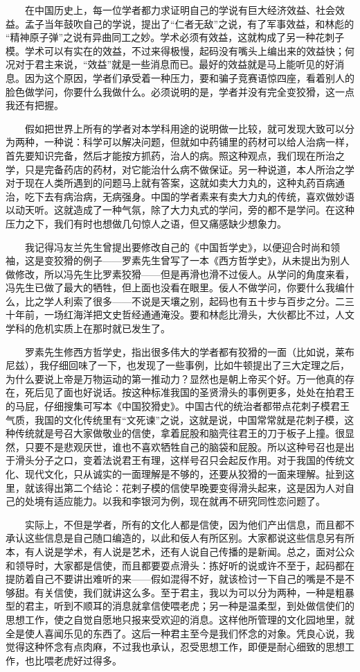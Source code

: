 　　在中国历史上，每一位学者都力求证明自己的学说有巨大经济效益、社会效益。孟子当年鼓吹自己的学说，提出了“仁者无敌”之说，有了军事效益，和林彪的 “精神原子弹”之说有异曲同工之妙。学术必须有效益，这就构成了另一种花刺子模。学术可以有实在的效益，不过来得极慢，起码没有嘴头上编出来的效益快；何况对于君主来说，“效益”就是一些消息而已。最好的效益就是马上能听见的好消息。因为这个原因，学者们承受着一种压力，要和骗子竞赛语惊四座，看着别人的脸色做学问，你要什么我做什么。必须说明的是，学者并没有完全变狡猾，这一点我还有把握。 

　　假如把世界上所有的学者对本学科用途的说明做一比较，就可发现大致可以分为两种，一种说：科学可以解决问题，但就如中药铺里的药材可以给人治病一样，首先要知识完备，然后才能按方抓药，治人的病。照这种观点，我们现在所治之学，只是完备药店的药材，对它能治什么病不做保证。另一种说道，本人所治之学对于现在人类所遇到的问题马上就有答案，这就如卖大力丸的，这种丸药百病通治，吃下去有病治病，无病强身。中国的学者素来有卖大力丸的传统，喜欢做妙语以动天听。这就造成了一种气氛，除了大力丸式的学问，旁的都不是学问。在这种压力之下，我们有时也想做几句惊人之语，但又痛感缺少想象力。 

　　我记得冯友兰先生曾提出要修改自己的《中国哲学史》，以便迎合时尚和领袖，这是变狡猾的例子——罗素先生曾写了一本《西方哲学史》，从未提出为别人做修改，所以冯先生比罗素狡猾——但是再滑也滑不过佞人。从学问的角度来看，冯先生已做了最大的牺牲，但上面也没看在眼里。佞人不做学问，你要什么我编什么，比之学人利索了很多——不说是天壤之别，起码也有五十步与百步之分。二三十年前，一场红海洋把文史哲经通通淹没。要和林彪比滑头，大伙都比不过，人文学科的危机实质上在那时就已发生了。 

　　罗素先生修西方哲学史，指出很多伟大的学者都有狡猾的一面（比如说，莱布尼兹），我仔细回味了一下，也发现了一些事例，比如牛顿提出了三大定理之后，为什么要说上帝是万物运动的第一推动力？显然也是朝上帝买个好。万一他真的存在，死后见了面也好说话。按这种标准我国的圣贤滑头的事例更多，处处在拍君王的马屁，仔细搜集可写本《中国狡猾史》。中国古代的统治者都带点花刺子模君王气质，我国的文化传统里有“文死谏”之说，这就是说，中国常常就是花刺子模，这种传统就是号召大家做敬业的信使，拿着屁股和脑壳往君王的刀于板子上撞。很显然，只要不是悲观厌世，谁也不喜欢牺牲自己的脑袋和屁股。所以这种号召也是出于滑头分子之口，变着法说君王有理，这样号召只会起反作用。对于我国的传统文化、现代文化，只从诚实的一面理解是不够的，还要从狡猾的一面来理解。扯到这里，就该得出第二个结论：花剌子模的信使早晚要变得滑头起来，这是因为人对自己的处境有适应能力。以我和李银河为例，现在就再不研究同性恋问题了。 

　　实际上，不但是学者，所有的文化人都是信使，因为他们产出信息，而且都不承认这些信息是自己随口编造的，以此和佞人有所区别。大家都说这些信息另有所本，有人说是学术，有人说是艺术，还有人说自己传播的是新闻。总之，面对公众和领导时，大家都是信使，而且都要耍点滑头：拣好听的说或许不至于，起码都在提防着自己不要讲出难听的来——假如混得不好，就该检讨一下自己的嘴是不是不够甜。有关信使，我们就讲这么多。至于君主，我以为可以分为两种，一种是粗暴型的君主，听到不顺耳的消息就拿信使喂老虎；另一种是温柔型，到处做信使们的思想工作，使之自觉自愿地只报来受欢迎的消息。这样他所管理的文化园地里，就全是使人喜闻乐见的东西了。这后一种君主至今是我们怀念的对象。凭良心说，我觉得这种怀念有点肉麻，不过我也承认，忍受思想工作，即便是耐心细致的思想工作，也比喂老虎好过得多。 

